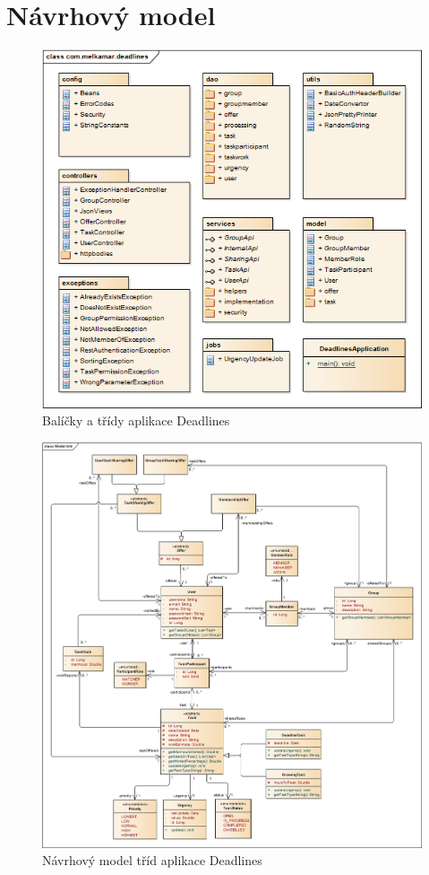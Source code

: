 \documentclass[thesis=B,czech]{FITthesis}[2012/06/26]
\begin{document}
\chapter{Návrhový model}

\begin{figure}\centering
	\includegraphics[width=1\textwidth]{ea-diagrams/packages/root.png}
	\caption[Balíčky tříd]{Balíčky a třídy aplikace Deadlines}
	\label{diagram:packages-root}
\end{figure}

\begin{figure}\centering
	\includegraphics[width=1\textwidth]{ea-diagrams/class-model.png}
	\caption[Model tříd]{Návrhový model tříd aplikace Deadlines}
	\label{diagram:class-model}
\end{figure}
\end{document}
